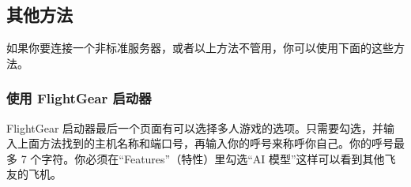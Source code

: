 \ifchinese
\subsection{其他方法}

如果你要连接一个非标准服务器，或者以上方法不管用，你可以使用下面的这些方法。
\fi
\iffalse
\IfLanguageName{english}{
\subsection{Other Methods}

If you are connecting to a non-standard server, or the above method does not work, you can also connect
using the methods below.
}{}
\fi
{}

\ifchinese
\subsubsection{使用 FlightGear 启动器}

FlightGear 启动器最后一个页面有可以选择多人游戏的选项。只需要勾选，并输入上面方法找到的主机名称和端口号，再输入你的呼号来称呼你自己。你的呼号最多 7 个字符。你必须在“Features”（特性）里勾选“AI 模型”这样可以看到其他飞友的飞机。
\fi
\iffalse
\IfLanguageName{english}{
\subsubsection{Using the FlightGear Launcher}

The final screen of the FlightGear Launcher has a section for Multiplayer.
Simply select the checkbox, enter the hostname and port
number you noted above and choose a callsign to identify yourself.
Your callsign can be up to 7 characters in length.
You must also check The AI models checkbox under Features to make other aircraft visible.
}{}
\fi


